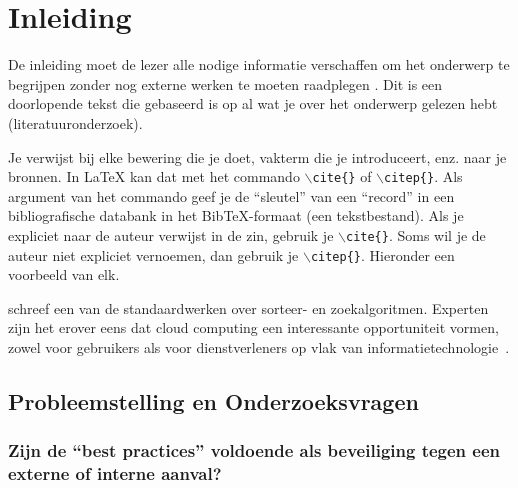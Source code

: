 \documentclass[pdftex,a4paper,12pt]{report}
\begin{document}
\tableofcontents



\chapter{Inleiding}
\label{ch:inleiding}

De inleiding moet de lezer alle nodige informatie verschaffen om het onderwerp te begrijpen zonder nog externe werken te moeten raadplegen \citep{Pollefliet2011}. Dit is een doorlopende tekst die gebaseerd is op al wat je over het onderwerp gelezen hebt (literatuuronderzoek). \newline \newline

Je verwijst bij elke bewering die je doet, vakterm die je introduceert, enz. naar je bronnen. In \LaTeX{} kan dat met het commando \texttt{$\backslash${cite\{\}}} of \texttt{$\backslash${citep\{\}}}. Als argument van het commando geef je de ``sleutel'' van een ``record'' in een bibliografische databank in het Bib\TeX{}-formaat (een tekstbestand). Als je expliciet naar de auteur verwijst in de zin, gebruik je \texttt{$\backslash${}cite\{\}}.
Soms wil je de auteur niet expliciet vernoemen, dan gebruik je \texttt{$\backslash${}citep\{\}}. Hieronder een voorbeeld van elk.

\cite{Knuth1998} schreef een van de standaardwerken over sorteer- en zoekalgoritmen. Experten zijn het erover eens dat cloud computing een interessante opportuniteit vormen, zowel voor gebruikers als voor dienstverleners op vlak van informatietechnologie~\citep{Creeger2009}.

\section{Probleemstelling en Onderzoeksvragen}
\label{sec:onderzoeksvragen}

\subsection{Zijn de "`best practices"' voldoende als beveiliging tegen een externe of interne aanval?}
\end{document}
